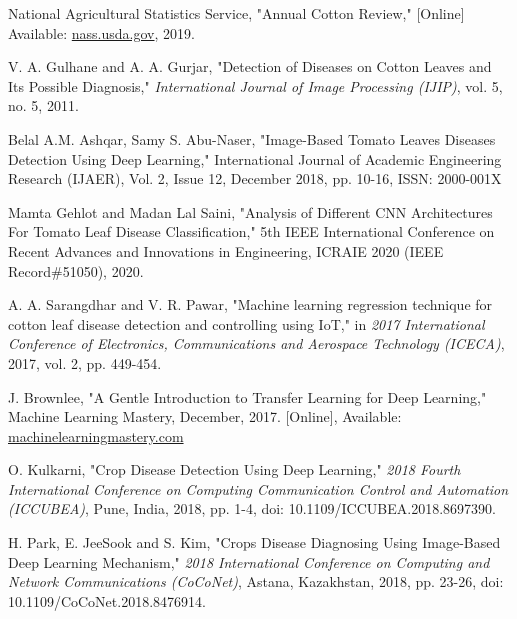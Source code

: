 \documentclass[conference]{IEEEtran}
\begin{document}
    
\begin{thebibliography}{00}

 National Agricultural Statistics Service, "Annual Cotton Review," [Online] Available: \href{https://www.nass.usda.gov/Statistics_by_State/Texas/Publications/Current_News_Release/2020_Rls/tx-cotton-review-2020.pdf}{nass.usda.gov}, 2019.

 V. A. Gulhane and A. A. Gurjar, "Detection of Diseases on Cotton Leaves and Its Possible Diagnosis," \textit{International Journal of Image Processing (IJIP)}, vol. 5, no. 5, 2011.

 Belal A.M. Ashqar, Samy S. Abu-Naser, "Image-Based Tomato Leaves Diseases Detection Using Deep Learning," International Journal of Academic Engineering Research (IJAER), Vol. 2, Issue 12, December 2018, pp. 10-16, ISSN: 2000-001X

 Mamta Gehlot and Madan Lal Saini, "Analysis of Different CNN Architectures For Tomato Leaf Disease Classification," 5th IEEE International Conference on Recent Advances and Innovations in Engineering, ICRAIE 2020 (IEEE Record\#51050), 2020. 

 A. A. Sarangdhar and V. R. Pawar, "Machine learning regression technique for cotton leaf disease detection and controlling using IoT," in \textit{2017 International Conference of Electronics, Communications and Aerospace Technology (ICECA)}, 2017, vol. 2, pp. 449-454.

 J. Brownlee, "A Gentle Introduction to Transfer Learning for Deep Learning," Machine Learning Mastery, December, 2017. [Online], Available: \href{https://machinelearningmastery.com/transfer-learning-for-deep-learning/#:~:text=Transfer\%20learning\%20is\%20a\%20machine,model\%20on\%20a\%20second\%20task.&text=Common\%20examples\%20of\%20transfer\%20learning,your\%20own\%20predictive\%20modeling\%20problems.}{machinelearningmastery.com}

 O. Kulkarni, "Crop Disease Detection Using Deep Learning," \textit{2018 Fourth International Conference on Computing Communication Control and Automation (ICCUBEA)}, Pune, India, 2018, pp. 1-4, doi: 10.1109/ICCUBEA.2018.8697390.

 H. Park, E. JeeSook and S. Kim, "Crops Disease Diagnosing Using Image-Based Deep Learning Mechanism," \textit{2018 International Conference on Computing and Network Communications (CoCoNet)}, Astana, Kazakhstan, 2018, pp. 23-26, doi: 10.1109/CoCoNet.2018.8476914.


\end{thebibliography}
\end{document}
